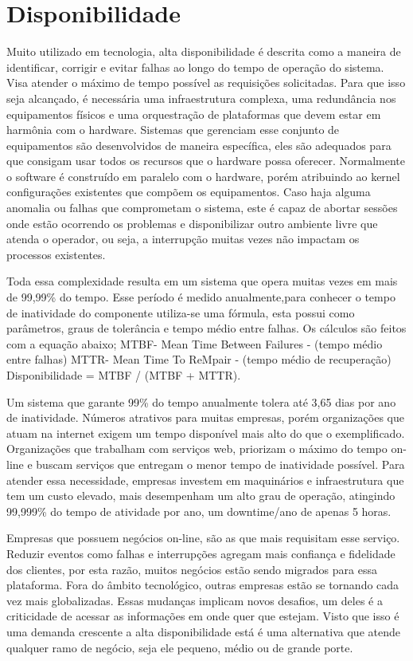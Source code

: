 \chapter{Disponibilidade}

Muito utilizado em tecnologia, alta disponibilidade é descrita como a maneira de identificar, corrigir e evitar falhas ao longo
do tempo de operação do sistema. Visa atender o máximo de tempo possível as requisições solicitadas. Para que isso seja
alcançado, é necessária uma infraestrutura complexa, uma redundância nos equipamentos físicos e uma orquestração de plataformas
que devem estar em harmônia com o hardware. Sistemas que gerenciam esse conjunto de equipamentos são desenvolvidos de maneira
específica, eles são adequados para que consigam usar todos os recursos que o hardware possa oferecer. Normalmente o software é
construído em paralelo com o hardware, porém atribuindo ao kernel configurações existentes que compõem os equipamentos.
Caso haja alguma anomalia ou falhas que comprometam o sistema, este é capaz de abortar sessões onde estão ocorrendo os problemas
e disponibilizar outro ambiente livre que atenda o operador, ou seja, a interrupção muitas vezes não impactam os processos
existentes.


Toda essa complexidade resulta em um sistema que opera muitas vezes em mais de 99,99\% do tempo. Esse período é medido
anualmente,para conhecer o tempo de inatividade do componente utiliza-se uma fórmula, esta possui como parâmetros, graus
de tolerância e
tempo médio entre falhas. Os cálculos são feitos com a equação abaixo;
MTBF- Mean Time Between Failures - (tempo médio entre falhas)
MTTR- Mean Time To ReMpair - (tempo médio de recuperação)
Disponibilidade = MTBF / (MTBF + MTTR).


Um sistema que garante 99\% do tempo anualmente tolera até 3,65 dias por ano de inatividade. Números atrativos para muitas
empresas, porém organizações que atuam na internet exigem um tempo disponível mais alto do que o exemplificado. Organizações
que trabalham com serviços web, priorizam o máximo do tempo on-line e buscam serviços que entregam o menor tempo de inatividade
possível. Para atender essa necessidade, empresas investem em maquinários e infraestrutura que tem um custo elevado, mais
desempenham um alto grau de operação, atingindo 99,999\% do tempo de atividade por ano, um downtime/ano de apenas 5 horas.


Empresas que possuem negócios on-line, são as que mais requisitam esse serviço. Reduzir eventos como falhas e interrupções
agregam mais confiança e fidelidade dos clientes, por esta razão, muitos negócios estão sendo migrados para essa plataforma.
Fora do âmbito tecnológico, outras empresas estão se tornando cada vez mais globalizadas. Essas mudanças implicam novos
desafios, um deles é a criticidade de acessar as informações em onde quer que estejam. Visto que isso é uma demanda crescente
a alta disponibilidade está é uma alternativa que atende qualquer ramo de negócio, seja ele pequeno, médio ou de grande porte.


